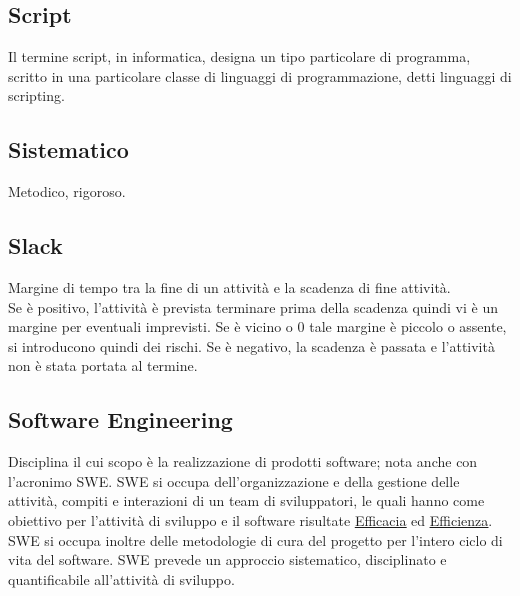 
	
	\subsection{Script}
	\label{sec:script}
	Il termine script, in informatica, designa un tipo particolare di programma, scritto in una particolare classe di linguaggi di programmazione, detti linguaggi di scripting.
	
	\subsection{Sistematico}
	\label{sec:sistematico}
	Metodico, rigoroso.

	\subsection{Slack}
	\label{sec:slack}
	Margine di tempo tra la fine di un attività e la scadenza di fine attività. \\
	Se è positivo, l'attività è prevista terminare prima della scadenza quindi vi è un margine per eventuali imprevisti. Se è vicino o 0 tale margine è piccolo o assente, si introducono quindi dei rischi. Se è negativo, la scadenza è passata e l'attività non è stata portata al termine.
	
	\subsection{Software Engineering}
	\label{sec:swe}
	Disciplina il cui scopo è la realizzazione di prodotti software; nota anche con l'acronimo SWE.
	SWE si occupa dell'organizzazione e della gestione delle attività, compiti e interazioni di un team di sviluppatori,
	le quali hanno come obiettivo per l'attività di sviluppo e il software risultate \underline{\hyperref[sec:efficacia]{Efficacia}} ed \underline{\hyperref[sec:efficienza]{Efficienza}}.	
	SWE si occupa inoltre delle metodologie di cura del progetto per l'intero ciclo di vita del software.
	SWE prevede un approccio sistematico, disciplinato e quantificabile all'attività di sviluppo.

